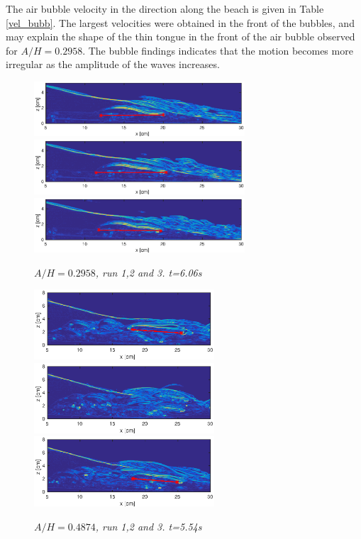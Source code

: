\documentclass[a4paper, 11pt, english, twoside, openright]{article}
\begin{document}
The air bubble velocity in the direction along the beach is given in Table \ref{vel_bubb}. The largest velocities were obtained in the front of the bubbles, and may explain the shape of the thin tongue in the front of the air bubble observed for $A/H=0.2958$. The bubble findings indicates that the motion becomes more irregular as the amplitude of the waves increases.
\begin{figure}[]
\centering
\includegraphics[width=0.7\textwidth]{./Figures/BUBBLE/bubble_30_run1.eps}
\includegraphics[width=0.7\textwidth]{./Figures/BUBBLE/bubble_30_run2.eps}
\includegraphics[width=0.7\textwidth]{./Figures/BUBBLE/bubble_30_run3.eps}
\caption{\textit{$A/H=0.2958$, run 1,2 and 3. t=6.06s}}
\label{fig:bubble_30}
\end{figure}

\begin{figure}[]
\centering
\includegraphics[width=0.6\textwidth]{./Figures/BUBBLE/bubble_50_run1.eps}
\includegraphics[width=0.6\textwidth]{./Figures/BUBBLE/bubble_50_run2.eps}
\includegraphics[width=0.6\textwidth]{./Figures/BUBBLE/bubble_50_run3.eps}
\caption{\textit{$A/H=0.4874$, run 1,2 and 3. t=5.54s}}
\label{fig:bubble_50}
\end{figure} 
\end{document}
